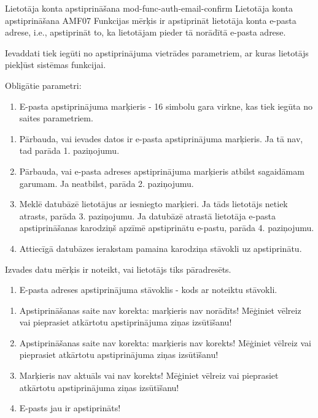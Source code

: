\moduleFunctionTable
{Lietotāja konta apstiprināšana}
{mod-func-auth-email-confirm}
{Lietotāja konta apstiprināšana}
{AMF07}
{
	Funkcijas mērķis ir apstiprināt lietotāja konta e-pasta adrese, i.e., apstiprināt to, ka lietotājam pieder tā norādītā e-pasta adrese.
}
{
	Ievaddati tiek iegūti no apstiprinājuma vietrādes parametriem, ar kuras lietotājs piekļūst sistēmas funkcijai.

	Obligātie parametri:
	\begin{enumerate}
		\item E-pasta apstiprinājuma marķieris - 16 simbolu gara virkne, kas tiek iegūta no saites parametriem.
	\end{enumerate}

}
{
	\begin{enumerate}
		\item Pārbauda, vai ievades datos ir e-pasta apstiprinājuma marķieris.
		      Ja tā nav, tad parāda 1. paziņojumu.
		\item Pārbauda, vai e-pasta adreses apstiprinājuma marķieris atbilst sagaidāmam garumam.
		      Ja neatbilst, parāda 2. paziņojumu.
		\item Meklē datubāzē lietotājus ar iesniegto marķieri.
		      Ja tāds lietotājs netiek atrasts, parāda 3. paziņojumu.
		      Ja datubāzē atrastā lietotāja e-pasta apstiprināšanas karodziņš apzīmē apstiprinātu e-pastu, parāda 4. paziņojumu.
		\item Attiecīgā datubāzes ierakstam pamaina karodziņa stāvokli uz apstiprinātu.
	\end{enumerate}
}
{
	Izvades datu mērķis ir noteikt, vai lietotājs tiks pāradresēts.

	\begin{enumerate}
		\item E-pasta adreses apstiprinājuma stāvoklis - kods ar noteiktu stāvokli.
	\end{enumerate}

}
{
	\begin{enumerate}
		\item Apstiprināšanas saite nav korekta: marķieris nav norādīts! Mēģiniet vēlreiz vai pieprasiet atkārtotu apstiprinājuma ziņas izsūtīšanu!
		\item Apstiprināšanas saite nav korekta: marķieris nav korekts! Mēģiniet vēlreiz vai pieprasiet atkārtotu apstiprinājuma ziņas izsūtīšanu!
		\item Marķieris nav aktuāls vai nav korekts! Mēģiniet vēlreiz vai pieprasiet atkārtotu apstiprinājuma ziņas izsūtīšanu!
		\item E-pasts jau ir apstiprināts!
	\end{enumerate}
}
